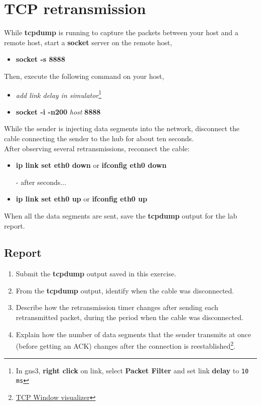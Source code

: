 \documentclass{../UTNetLab}
\begin{document}
\section{TCP retransmission}
    While \textbf{tcpdump} is running to capture the packets between your host and a remote host, start a \textbf{socket} server on the remote host,
    \begin{itemize}
    	\item \textbf{socket -s 8888}
    \end{itemize}
    Then, execute the following command on your host,
    \begin{itemize}
        \item \textit{add link delay in simulator}\footnote{In gns3, \textbf{right click} on link, select \textbf{Packet Filter} and set link \textbf{delay} to \texttt{10 ms}}
        \item \textbf{socket -i -n200} \textit{host} \textbf{8888}
    \end{itemize}
    While the sender is injecting data segments into the network, disconnect the cable connecting the sender to the hub for about ten seconds. \\
    After observing several retransmissions, reconnect the cable:
    \begin{itemize}
    	\setlength{\itemindent}{30pt}
        \item \textbf{ip link set eth0 down} or \textbf{ifconfig eth0 down}
        \item [-] after seconds...
        \item \textbf{ip link set eth0 up} or \textbf{ifconfig eth0 up}
    \end{itemize}
    When all the data segments are sent, save the \textbf{tcpdump} output for the lab report.
    \subsection*{Report}
    \begin{enumerate}
        \item Submit the \textbf{tcpdump} output saved in this exercise.
        \item From the \textbf{tcpdump} output, identify when the cable was disconnected.
        \item Describe how the retransmission timer changes after sending each retransmitted packet, during the period when the cable was disconnected.
        \item Explain how the number of data segments that the sender transmits at once (before getting an ACK) changes after the connection is reestablished\footnote{\href{http://www.ccs-labs.org/teaching/rn/animations/gbn_sr/}{TCP Window visualizer}}.
    \end{enumerate}
    
\end{document}
